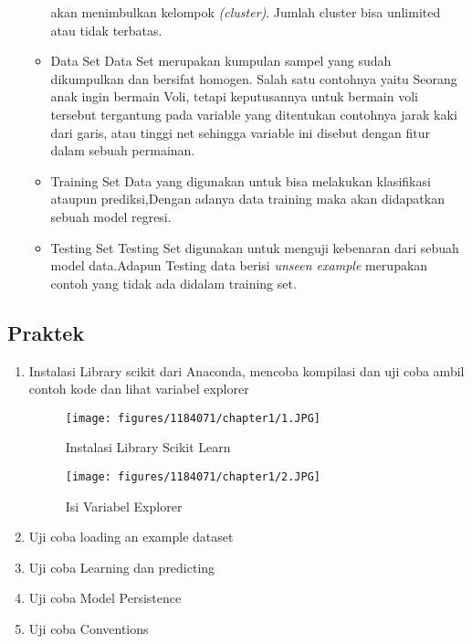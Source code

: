 \begin{enumerate}
\begin{itemize}
{akan menimbulkan kelompok \textit{(cluster)}. Jumlah cluster bisa unlimited atau tidak terbatas}.
		\item Data Set
		\hfill\break
Data Set merupakan kumpulan sampel yang sudah dikumpulkan dan bersifat
homogen. Salah satu contohnya yaitu Seorang anak ingin bermain Voli, tetapi keputusannya untuk bermain voli tersebut tergantung pada variable yang ditentukan contohnya jarak kaki dari garis, atau tinggi net sehingga variable ini disebut dengan fitur dalam sebuah permainan.
		\item Training Set
		\hfill\break
Data yang digunakan untuk bisa melakukan klasifikasi ataupun prediksi,Dengan adanya data training maka akan didapatkan sebuah model regresi.		
		\item Testing Set
		\hfill\break
Testing Set digunakan untuk menguji kebenaran dari sebuah model data.Adapun Testing data berisi \textit{unseen example} merupakan contoh yang tidak ada didalam training set.
	\end{itemize}
\end{enumerate}
\subsection{Praktek}
\begin{enumerate}
	\item Instalasi Library scikit dari Anaconda, mencoba kompilasi dan uji coba ambil contoh kode dan lihat variabel explorer
	\hfill\break
	\begin{figure}[h]
		\texttt{[image: figures/1184071/chapter1/1.JPG]}
		\centering
		\caption{Instalasi Library Scikit Learn}
	\end{figure}
	\begin{figure}[h]
		\texttt{[image: figures/1184071/chapter1/2.JPG]}
		\centering
		\caption{Isi Variabel Explorer}
	\end{figure}
	\newpage\item Uji coba loading an example dataset
	\hfill\break

\item Uji coba Learning dan predicting
	\hfill\break
	
\item Uji coba Model Persistence
	\hfill\break
		
	\item Uji coba Conventions
	\hfill\break
	
	\end{enumerate}

